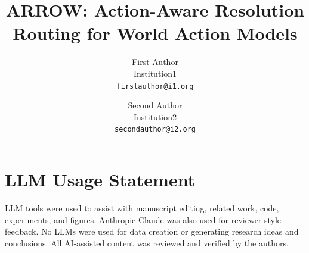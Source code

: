 \documentclass[10pt,twocolumn,letterpaper]{article}
\title{ARROW: Action-Aware Resolution Routing for World Action Models}
\author{First Author\\
Institution1\\
{\tt\small firstauthor@i1.org}
\and
Second Author\\
Institution2\\
{\tt\small secondauthor@i2.org}
}
\begin{document}









\newpage
\section*{LLM Usage Statement}
LLM tools were used to assist with manuscript editing, related work, code, experiments, and figures. Anthropic Claude was also used for reviewer-style feedback. No LLMs were used for data creation or generating research ideas and conclusions. All AI-assisted content was reviewed and verified by the authors.

\nocite{pai2025mimicvideo}
{
    \small
    
    
}

\newif\ifsuppl
\supplfalse
\ifsuppl
  
\fi
\end{document}
